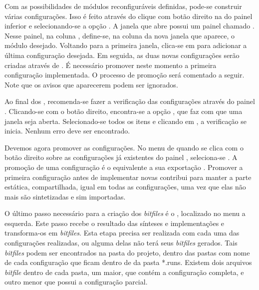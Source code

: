 \documentclass[11pt,a4paper,oneside]{book}
\begin{document}
Com as possibilidades de módulos reconfiguráveis definidas, pode-se construir várias configurações.
Isso é feito através do clique com botão direito na  do painel inferior e selecionando-se a opção .
A janela que abre possui um painel chamado .
Nesse painel, na coluna , define-se, na coluna  da nova janela que aparece, o módulo desejado.
Voltando para a primeira janela, clica-se em  para adicionar a última configuração desejada.
Em seguida, as duas novas configurações serão criadas através de .
É necessário promover neste momento a primeira configuração implementada.
O processo de promoção será comentado a seguir.
Note que os avisos que aparecerem podem ser ignorados.

Ao final dos , recomenda-se fazer a verificação das configurações através do painel .
Clicando-se com o botão direito, encontra-se a opção , que faz com que uma janela seja aberta.
Selecionado-se todos os itens e clicando em , a verificação se inicia.
Nenhum erro deve ser encontrado.

Devemos agora promover as configurações.
No menu de quando se clica com o botão direito sobre as configurações já existentes do painel , seleciona-se .
A promoção de uma configuração é o equivalente a sua exportação \cite{ug748}.
Promover a primeira configuração antes de implementar novas contribui para manter a parte estática, compartilhada, igual em todas as configurações, uma vez que elas não mais são sintetizadas e sim importadas.

O último passo necessário para a criação dos \textit{bitfiles} é o , localizado no menu a esquerda.
Este passo recebe o resultado das sínteses e implementações e transforma-os em \textit{bitfiles}.
Esta etapa precisa ser realizada com cada uma das configurações realizadas, ou alguma delas não terá seus \textit{bitfiles} gerados.
Tais \textit{bitfiles} podem ser encontrados na pasta do projeto, dentro das pastas com nome de cada configuração que ficam dentro de da pasta *.runs.
Existem dois arquivos \textit{bitfile} dentro de cada pasta, um maior, que contém a configuração completa, e outro menor que possui a configuração parcial.
\end{document}
